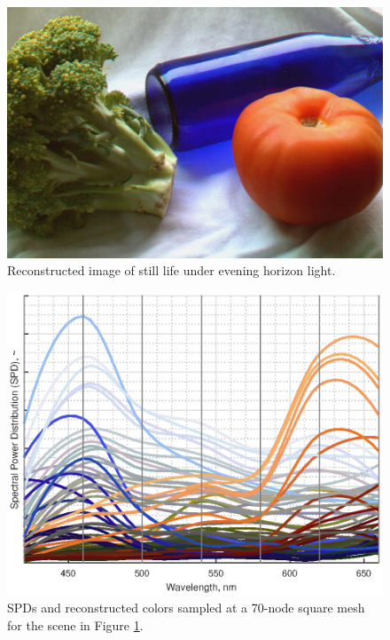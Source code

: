 \documentclass[twocolumn,10pt]{asme2ej}
\begin{document}
\begin{figure}[H]
\begin{centering}
  \includegraphics[height=0.55\linewidth]{broccoli_bottle_tomato.jpg}
  \caption{Reconstructed image of still life under evening horizon light.}
  \label{tomato_mesh}
  \end{centering}
\end{figure}

\begin{figure}[H]
\begin{centering}
  \includegraphics[height=0.6\linewidth]{broccoli_bottle_tomato.eps}
  \caption{SPDs and reconstructed colors sampled at a 70-node square mesh for the scene in Figure \ref{tomato_mesh}.}
  \label{tomato_SPDs}
  \end{centering}
\end{figure}

\clearpage
\end{document}
